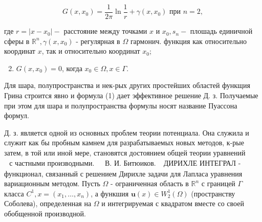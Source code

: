 \documentclass[10pt]{article}
\begin{document}
\[

G\left(x, x_{0}\right)=\frac{1}{2 \pi} \ln \frac{1}{r}+\gamma\left(x, x_{0}\right) \text { при } n=2,

\]



где $r=\left|x-x_{0}\right|-$ расстояние между точками $x$ и $x_{0}, s_{n}-$ плошадь единичной сферы в $\mathbb{R}^{n}, \gamma\left(x, x_{0}\right)$ - регулярная в $\Omega$ гармонич. функция как относительно координат $x$, так и относительно координат $x_{0}$;



\begin{enumerate}

  \setcounter{enumi}{1}

  \item $G\left(x, x_{0}\right)=0$, когда $x_{0} \in \Omega, x \in \Gamma$.

\end{enumerate}



Для шара, полупространства и нек-рых других простейших областей функщия Грина строится явно и формула (1) дает эффективное решение Д. з. Получаемые при этом для шара и полупространства формулы носят название Пуассона формул.



Д. з. является одной из основных проблем теории потенциала. Она служила и служит как бы пробным камнем для разрабатываемых новых методов, к-рые затем, в той или иной мере, становятся достоянием общей теории уравнений $\begin{array}{ll}\text { с частными производными. } & \text { В. И. Битюиков. }\end{array}$ ДИРИХЛЕ ИНТЕГРАЛ - функционал, связанный с решением Дирихле задачи для Лапласа уравнения вариационным методом. Пусть $\Omega$ - ограниченная область в $\mathbb{R}^{n}$ с границей $\Gamma$ класса $C^{1}, x=\left(x_{1}, \ldots, x_{n}\right)$, а функшия $\boldsymbol{u}(x) \in W_{2}^{1}(\Omega)$ (пространству Соболева), определенная на $\Omega$ и интегрируемая с квадратом вместе со своей обобщенной производной.
\end{document}

